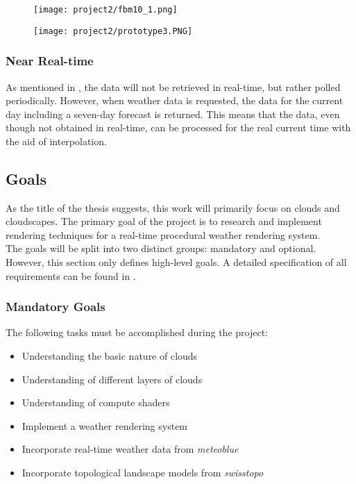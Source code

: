 \begin{figure}[H]
    \centering
        \begin{minipage}{0.47\linewidth}
            \texttt{[image: project2/fbm10\_1.png]}
        \end{minipage}
    \hfill
        \begin{minipage}{0.47\linewidth}
            \texttt{[image: project2/prototype3.PNG]}
        \end{minipage}  
\end{figure}

\subsubsection{Near Real-time}
As mentioned in , the data will not be retrieved in real-time, but rather polled periodically. However, when weather data is requested, the data for the current day including a seven-day forecast is returned.
This means that the data, even though not obtained in real-time, can be processed for the real current time with the aid of \gls{interpolation}.

\subsection{Goals}
\label{section:goals}
As the title of the thesis suggests, this work will primarily focus on clouds and cloudscapes.
The primary goal of the project is to research and implement rendering techniques for a real-time \gls{procedural} weather rendering system.
\\
The goals will be split into two distinct groups: mandatory and optional. However, this section only defines high-level goals. A detailed specification of all requirements can be found in .

\subsubsection{Mandatory Goals}
The following tasks must be accomplished during the project:
\begin{itemize}
    \item Understanding the basic nature of clouds
    \item Understanding of different layers of clouds
    \item Understanding of compute shaders
    \item Implement a weather rendering system
    \item Incorporate real-time weather data from \emph{meteoblue}
    \item Incorporate topological landscape models from \emph{swisstopo}
\end{itemize}

